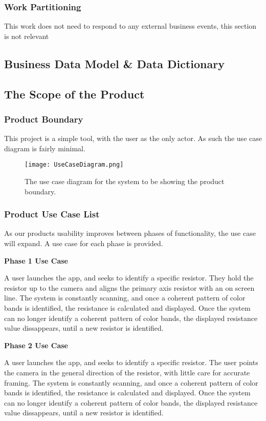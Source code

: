\documentclass{article}
\begin{document}
\subsubsection{Work Partitioning}

This work does not need to respond to any external business events, this section is not relevant

\subsection{Business Data Model \& Data Dictionary}

\subsection{The Scope of the Product}

\subsubsection{Product Boundary}
This project is a simple tool, with the user as the only actor.
As such the use case diagram is fairly minimal.

\begin{figure}[h]
    \texttt{[image: UseCaseDiagram.png]}
	\caption{The use case diagram for the system to be showing the product boundary.}
    \label{fig:use_case_diagram}
\end{figure}

\subsubsection{Product Use Case List}

As our products usability improves between phases of functionality, the use case will expand.
A use case for each phase is provided.

\textbf{ Phase 1 Use Case}

A user launches the app, and seeks to identify a specific resistor.
They hold the resistor up to the camera and aligns the primary axis resistor with an on screen line.
The system is constantly scanning, and once a coherent pattern of color bands is identified, the resistance is calculated and displayed.
Once the system can no longer identify a coherent pattern of color bands, the displayed resistance value dissappears, until a new resistor is identified.

\textbf{ Phase 2 Use Case}

A user launches the app, and seeks to identify a specific resistor.
The user points the camera in the general direction of the resistor, with little care for accurate framing.
The system is constantly scanning, and once a coherent pattern of color bands is identified, the resistance is calculated and displayed.
Once the system can no longer identify a coherent pattern of color bands, the displayed resistance value dissappears, until a new resistor is identified.
\end{document}
